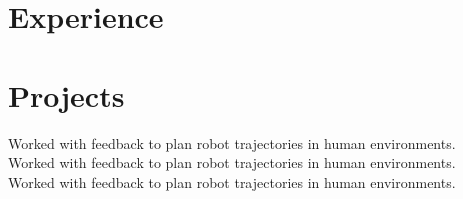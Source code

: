 \documentclass[]{deedy-resume-openfont}
\begin{document}
\hfill
\begin{minipage}[t]{0.66\textwidth}

\section{Experience}

\vspace{\topsep} %
\begin{tightemize}
\item
\item
\item
\end{tightemize}
\sectionsep

\begin{tightemize}
\item
\item
\item
\end{tightemize}
\sectionsep

\section{Projects}

Worked with feedback to plan robot trajectories in human environments.\\
Worked with feedback to plan robot trajectories in human environments.\\
Worked with feedback to plan robot trajectories in human environments.\\
\sectionsep


\end{minipage}
\end{document}
